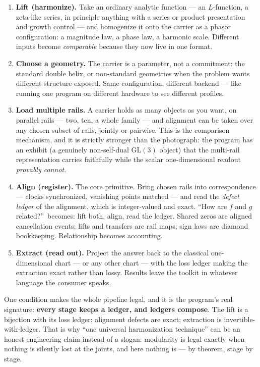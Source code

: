 \documentclass[11pt]{article}
\begin{document}
\begin{enumerate}
\item \textbf{Lift (harmonize).}  Take an ordinary analytic function --- an
$L$-function, a zeta-like series, in principle anything with a series or product
presentation and growth control --- and homogenize it onto the carrier as a
phasor configuration: a magnitude law, a phase law, a harmonic scale.  Different
inputs become \emph{comparable} because they now live in one format.
\item \textbf{Choose a geometry.}  The carrier is a parameter, not a commitment:
the standard double helix, or non-standard geometries when the problem wants
different structure exposed.  Same configuration, different backend --- like
running one program on different hardware to see different profiles.
\item \textbf{Load multiple rails.}  A carrier holds as many objects as you
want, on parallel rails --- two, ten, a whole family --- and alignment can be
taken over any chosen subset of rails, jointly or pairwise.  This is the
comparison mechanism, and it is strictly stronger than the photograph: the
program has an exhibit (a genuinely non-self-dual $\mathrm{GL}(3)$ object) that
the multi-rail representation carries faithfully while the scalar
one-dimensional readout \emph{provably cannot}.
\item \textbf{Align (register).}  The core primitive.  Bring chosen rails into
correspondence --- clocks synchronized, vanishing points matched --- and read
the \emph{defect ledger} of the alignment, which is integer-valued and exact.
``How are $f$ and $g$ related?''\ becomes: lift both, align, read the ledger.
Shared zeros are aligned cancellation events; lifts and transfers are rail maps;
sign laws are diamond bookkeeping.  Relationship becomes accounting.
\item \textbf{Extract (read out).}  Project the answer back to the classical
one-dimensional chart --- or any other chart --- with the loss ledger making the
extraction exact rather than lossy.  Results leave the toolkit in whatever
language the consumer speaks.
\end{enumerate}

One condition makes the whole pipeline legal, and it is the program's real
signature: \textbf{every stage keeps a ledger, and ledgers compose}.  The lift is
a bijection with its loss ledger; alignment defects are exact; extraction is
invertible-with-ledger.  That is why ``one universal harmonization technique''
can be an honest engineering claim instead of a slogan: modularity is legal
exactly when nothing is silently lost at the joints, and here nothing is ---
by theorem, stage by stage.
\end{document}
